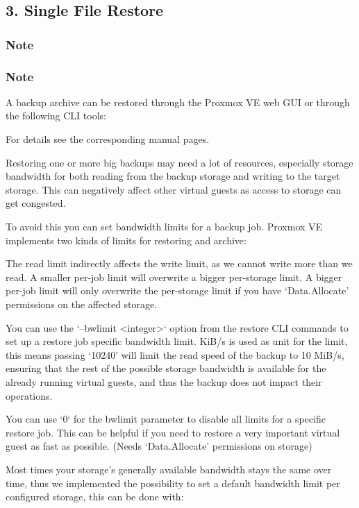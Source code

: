 \subsection{3. Single File Restore}

\subsubsection{Note}

\subsubsection{Note}

A backup archive can be restored through the Proxmox VE web GUI or through the following CLI tools:

For details see the corresponding manual pages.

Restoring one or more big backups may need a lot of resources, especially storage bandwidth for both reading from the backup storage and writing to the target storage. This can negatively affect other virtual guests as access to storage can get congested.

To avoid this you can set bandwidth limits for a backup job. Proxmox VE implements two kinds of limits for restoring and archive:

The read limit indirectly affects the write limit, as we cannot write more than we read. A smaller per-job limit will overwrite a bigger per-storage limit. A bigger per-job limit will only overwrite the per-storage limit if you have ‘Data.Allocate’ permissions on the affected storage.

You can use the ‘--bwlimit <integer>` option from the restore CLI commands to set up a restore job specific bandwidth limit. KiB/s is used as unit for the limit, this means passing `10240’ will limit the read speed of the backup to 10 MiB/s, ensuring that the rest of the possible storage bandwidth is available for the already running virtual guests, and thus the backup does not impact their operations.

You can use ‘0` for the bwlimit parameter to disable all limits for a specific restore job. This can be helpful if you need to restore a very important virtual guest as fast as possible. (Needs `Data.Allocate’ permissions on storage)

Most times your storage’s generally available bandwidth stays the same over time, thus we implemented the possibility to set a default bandwidth limit per configured storage, this can be done with:

